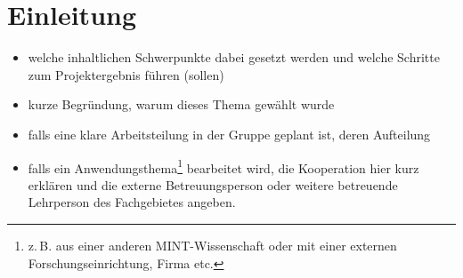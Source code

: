 \chapter{Einleitung}

\begin{itemize}
	\item welche inhaltlichen Schwerpunkte dabei gesetzt werden und welche Schritte zum Projektergebnis führen (sollen)
	\item kurze Begründung, warum dieses Thema gewählt wurde
	\item falls eine klare Arbeitsteilung in der Gruppe geplant ist, deren Aufteilung
	\item falls ein Anwendungsthema\footnote{z.\,B. aus einer anderen MINT-Wissenschaft oder mit einer externen Forschungseinrichtung, Firma etc.} bearbeitet wird, die Kooperation hier kurz erklären und die externe Betreuungsperson oder weitere betreuende Lehrperson des Fachgebietes angeben.
\end{itemize}


